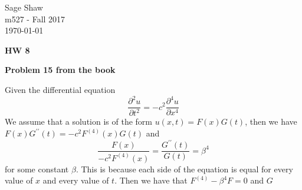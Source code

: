 \documentclass[12pt]{article}
\newcommand{\problem}[1]{\hspace{-4 ex} \large \textbf{Problem #1} }
\begin{document}
	\thispagestyle{empty}
	
	\begin{flushright}
		Sage Shaw \\
		m527 - Fall 2017 \\
		\today
	\end{flushright}
	
{\large \textbf{HW 8}}\bigbreak

\problem{15 from the book}

	Given the differential equation
	$$
	\frac{\partial^2u}{\partial t^2} = -c^2 \frac{\partial^4u}{\partial x^4}
	$$
	We assume that a solution is of the form $u(x,t) = F(x)G(t)$, then we have $F(x)G^{\prime\prime}(t) = -c^2 F^{(4)}(x)G(t)$ and
	$$
	\frac{F(x)}{-c^2 F^{(4)}(x)} = \frac{G^{\prime\prime}(t)}{G(t)} = \beta^4
	$$
	for some constant $\beta$. This is because each side of the equation is equal for every value of $x$ and every value of $t$. Then we have that $F^{(4)}- \beta^4F = 0$ and $G$
\end{document}
